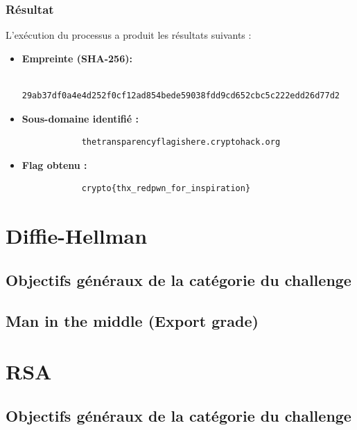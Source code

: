 \documentclass[12pt, a4paper]{article}
\begin{document}
        \subsubsection{Résultat}
            L'exécution du processus a produit les résultats suivants : 
            \begin{itemize} 
            \item \textbf{Empreinte (SHA-256):} 
            \begin{verbatim}
            29ab37df0a4e4d252f0cf12ad854bede59038fdd9cd652cbc5c222edd26d77d2
            \end{verbatim} 
            \item \textbf{Sous-domaine identifié :} 
            \begin{verbatim}
            thetransparencyflagishere.cryptohack.org
            \end{verbatim} 
            \item \textbf{Flag obtenu :} 
            \begin{verbatim}
            crypto{thx_redpwn_for_inspiration}
            \end{verbatim} 
            \end{itemize}


\section{Diffie-Hellman}
    \subsection{Objectifs généraux de la catégorie du challenge}
    
    \subsection{Man in the middle (Export grade)}

\section{RSA}
    \subsection{Objectifs généraux de la catégorie du challenge}

\end{document}
